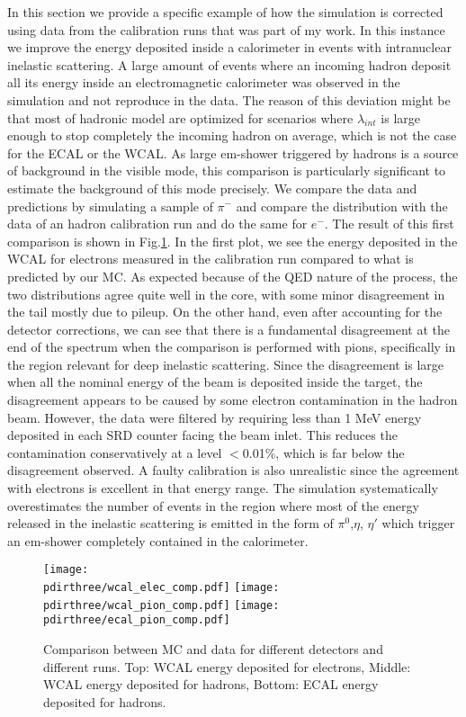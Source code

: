 In this section we provide a specific example of how the simulation is corrected using data from the calibration runs that was part of my work. In this instance we improve the energy deposited inside a calorimeter in events with intranuclear inelastic scattering. A large amount of events where an incoming hadron deposit all its energy inside an electromagnetic calorimeter was observed in the simulation and not reproduce in the data. The reason of this deviation might be that most of hadronic model are optimized for scenarios where $\lambda_{int}$ is large enough to stop completely the incoming hadron on average, which is not the case for the ECAL or the WCAL. As large em-shower triggered by hadrons is a source of background in the visible mode, this comparison is particularly significant to estimate the background of this mode precisely.
We compare the data and predictions by simulating a sample of $\pi^-$ and compare the distribution with the data of an hadron calibration run and do the same for $e^-$. The result of this first comparison is shown in Fig.\ref{fig:ecal-comp}. In the first plot, we see the energy deposited in the WCAL for electrons measured in the calibration run compared to what is predicted by our MC. As expected because of the QED nature of the process, the two distributions agree quite well in the core, with some minor disagreement in the tail mostly due to pileup. On the other hand, even after accounting for the detector corrections, we can see that there is a fundamental disagreement at the end of the spectrum when the comparison is performed with pions, specifically in the region relevant for deep inelastic scattering. Since the disagreement is large when all the nominal energy of the beam is deposited inside the target, the disagreement appears to be caused by some electron contamination in the hadron beam. However, the data were filtered by requiring less than 1 MeV energy deposited in each SRD counter facing the beam inlet. This reduces the contamination conservatively at a level $<$0.01\%, which is far below the disagreement observed. A faulty calibration is also unrealistic since the agreement with electrons is excellent in that energy range. The simulation systematically overestimates the number of events in the region where most of the energy released in the inelastic scattering is emitted in the form of $\pi^0$,$\eta$, $\eta'$ which trigger an em-shower completely contained in the calorimeter.

\begin{figure}[bth!]
  \centering
  \texttt{[image: \\pdirthree/wcal\_elec\_comp.pdf]}
  \texttt{[image: \\pdirthree/wcal\_pion\_comp.pdf]}
  \texttt{[image: \\pdirthree/ecal\_pion\_comp.pdf]}
  \caption[MC/DATA Comparison of $\pi^-$ in ECAL and WCAL]{Comparison between MC and data for different detectors and different runs. Top: WCAL energy deposited for electrons, Middle: WCAL energy deposited for hadrons, Bottom: ECAL energy deposited for hadrons.}
  \label{fig:ecal-comp}
\end{figure}

